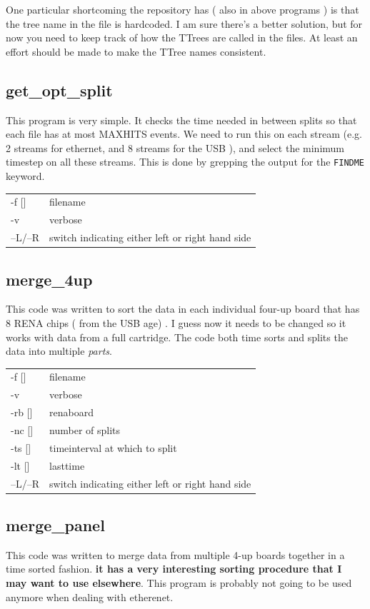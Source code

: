 \documentclass[12pt]{article}
\begin{document}
One particular shortcoming the repository has ( also in above programs ) is
that the tree name in the file is hardcoded. I am sure there's a better
solution, but for now you need to keep track of how the TTrees are called in
the files. At least an effort should be made to make the TTree names consistent.

\subsection{get\_opt\_split}
This program is very simple. It checks the time needed in between splits so that each file has at most MAXHITS events. We need to run this on each stream (e.g. 2 streams for ethernet, and 8 streams for the USB ), and select the minimum timestep on all these streams. This is done by grepping the output for the {\tt FINDME} keyword. \\

\begin{tabular}{ll}
-f []& filename\\
-v & verbose\\
--L/--R & switch indicating either left or right hand side\\
\end{tabular}

\subsection{merge\_4up}
This code was written to sort the data in each individual four-up board that has 8 RENA chips ( from the USB age) . I guess now it needs to be changed so it works with data from a full cartridge. The code both time sorts and splits the data into multiple {\em parts}. \\

\begin{tabular}{ll}
-f []& filename\\
-v & verbose\\
-rb []& renaboard\\
-nc []& number of splits\\
-ts []& timeinterval at which to split\\
-lt []& lasttime \\
--L/--R & switch indicating either left or right hand side\\
\end{tabular}


\subsection{merge\_panel}
This code was written to merge data from multiple 4-up boards together in a
time sorted fashion. {\bf it has a very interesting sorting procedure that I
  may want to use elsewhere}. This program is probably not going to be used
anymore when dealing with etherenet. \\
\end{document}
